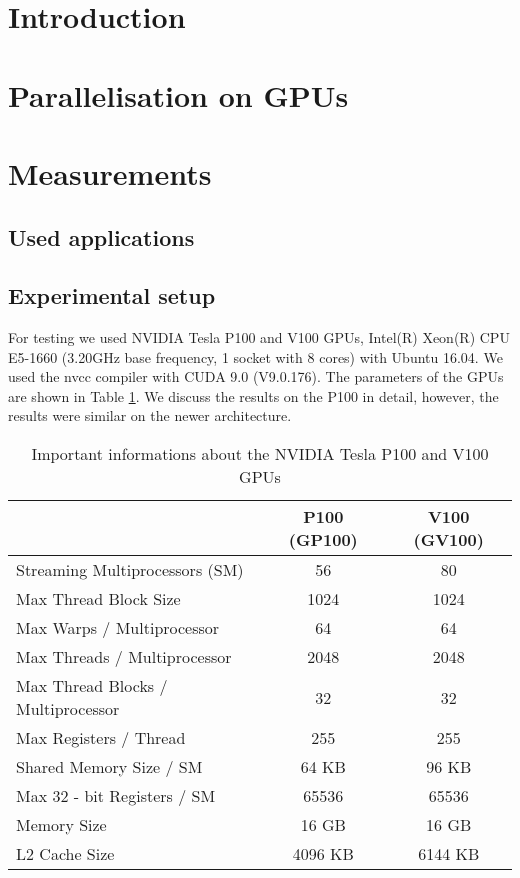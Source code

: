 \section{Introduction}\label{introduction}



\section{Parallelisation on GPUs}\label{parallelisation-on-gpu}



\section{Measurements}\label{measurements}

\subsection{Used applications}\label{used-applications}


\subsection{Experimental setup}\label{experimental-setup}
For testing we used NVIDIA Tesla P100 and V100 GPUs, Intel(R) Xeon(R) CPU
E5-1660 (3.20GHz base frequency, 1 socket with 8 cores) with Ubuntu 16.04. We
used the nvcc compiler with CUDA 9.0 (V9.0.176). The parameters of the GPUs
are shown in Table \ref{tab:GPU_datasheet}. We discuss the results on the
P100 in detail, however, the results were similar on the newer architecture.
\begin{table}
\centering
\begin{tabular}{|l|c|c|}
\hline
  & P100 (GP100) & V100 (GV100)\\ \hline
  Streaming Multiprocessors (SM) 		& 56	& 80\\ \hline
  Max Thread Block Size				& 1024	& 1024 \\ \hline
  Max Warps / Multiprocessor 			& 64 & 64	\\ \hline
  Max Threads / Multiprocessor		& 2048 & 2048	\\ \hline
  Max Thread Blocks / Multiprocessor 	& 32 & 32	\\ \hline
  Max Registers / Thread& 255 & 255	\\ \hline
  Shared Memory Size / SM	& 64 KB & 96 KB	\\ \hline
  Max 32 - bit Registers / SM			& 65536 & 65536\\ \hline
  Memory Size							& 16 GB	& 16 GB\\ \hline
  L2 Cache Size						& 4096 KB & 6144 KB\\ \hline
\end{tabular}
  \caption{Important informations about the NVIDIA Tesla P100 and V100 GPUs
  \cite{Pascal_whitepaper, Volta_whitepaper}}
\label{tab:GPU_datasheet}
\end{table}

